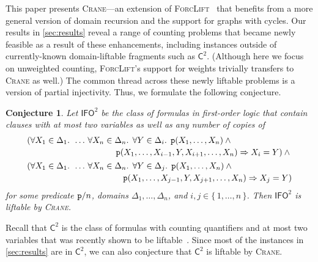 \documentclass{article}
\newtheorem{conjecture}{Conjecture}
\newcommand{\Ctwo}{$\mathsf{C}^{2}$}
\newcommand{\IFO}{$\mathsf{I}\mathsf{FO}^{2}$}
\newcommand{\predicate}{\texttt{\textup{p}}}
\begin{document}
This paper presents \textsc{Crane}---an extension of
\textsc{ForcLift}~\cite{DBLP:conf/ijcai/BroeckTMDR11} that benefits from a more
general version of domain recursion and the support for graphs with cycles. Our
results in \cref{sec:results} reveal a range of counting problems that became
newly feasible as a result of these enhancements, including instances outside of
currently-known domain-liftable fragments such as \Ctwo{}. (Although here we
focus on unweighted counting, \textsc{ForcLift}'s support for weights trivially
transfers to \textsc{Crane} as well.) The common thread across these newly
liftable problems is a version of partial injectivity. Thus, we formulate the
following conjecture.
\begin{conjecture}
  Let \IFO{} be the class of formulas in first-order logic that contain clauses
  with at most two variables as well as any number of copies of
  \begin{align*}
    &\begin{multlined}[t][0.9\linewidth]
      (\forall X_{1} \in \Delta_{1}\text{. }\dots\,\forall X_{n} \in \Delta_{n}\text{. }\forall Y \in \Delta_{i}\text{. }\predicate(X_{1}, \dots, X_{n}) \land{}\\
      \predicate(X_{1}, \dots, X_{i-1}, Y, X_{i+1}, \dots, X_{n}) \Rightarrow X_{i} = Y) \land{}
    \end{multlined}\\
    &\begin{multlined}[t][0.9\linewidth]
      (\forall X_{1} \in \Delta_{1}\text{. }\dots\,\forall X_{n} \in \Delta_{n}\text{. }\forall Y \in \Delta_{j}\text{. }\predicate(X_{1}, \dots, X_{n}) \land{}\\
      \predicate(X_{1}, \dots, X_{j-1}, Y, X_{j+1}, \dots, X_{n}) \Rightarrow X_{j} = Y)
    \end{multlined}
  \end{align*}
  for some predicate $\predicate/n$, domains
  $\Delta_{1}, \dots, \Delta_{n}$, and $i, j \in \{\, 1, \dots, n \,\}$. Then
  \IFO{} is liftable by \textsc{Crane}.
\end{conjecture}
Recall that \Ctwo{} is the class of formulas with counting quantifiers and at
most two variables that was recently shown to be
liftable~\cite{DBLP:journals/jair/Kuzelka21}. Since most of the instances in
\cref{sec:results} are in \Ctwo{}, we can also conjecture that \Ctwo{} is
liftable by \textsc{Crane}.
\end{document}
